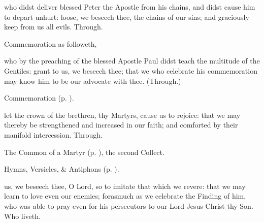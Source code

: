 \collect
{} who didst deliver blessed Peter the Apostle from his chains, and didst cause him to depart unhurt: loose, we beseech thee, the chains of our sins; and graciously keep from us all evils. Through.

\begin{rubric}
	 Commemoration  as followeth,
\end{rubric}
 who by the preaching of the blessed Apostle Paul didst teach the multitude of the Gentiles: grant to us, we beseech thee; that we who celebrate his commemoration may know him to be our advocate with thee. (Through.)

\begin{rubric}
	 Commemoration  (p. \pageref{HolyMaccabeesCollect}).
\end{rubric}



\memorialCollect\label{HolyMaccabeesCollect}
 let the crown of the brethren, thy Martyrs, cause us to rejoice: that we may thereby be strengthened and increased in our faith; and comforted by their manifold intercession. Through.



\begin{rubric}
	The Common of a Martyr (p. \pageref{CommonMartyrBishopCollect}), the second Collect.
\end{rubric}



\begin{rubric}
	Hymns, Versicles, \& Antiphons  (p. \pageref{SaintStephen}).
\end{rubric}

{} us, we beseech thee, O Lord, so to imitate that which we revere: that we may learn to love even our enemies; forasmuch as we celebrate the Finding of him, who was able to pray even for his persecutors to our Lord Jesus Christ thy Son. Who liveth.



